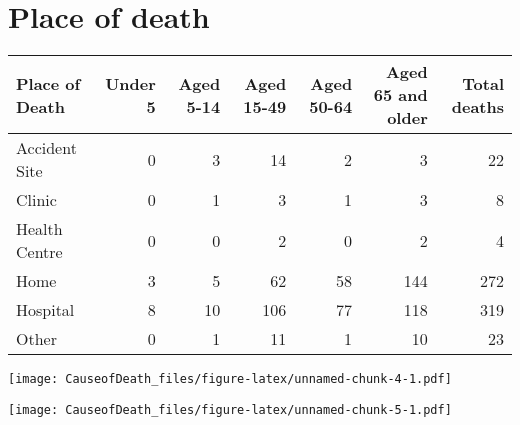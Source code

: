 \documentclass[
]{article}
\begin{document}
\hypertarget{place-of-death}{%
\section{Place of death}\label{place-of-death}}

\begin{table}[H]
\centering
\begin{tabular}{lrrrrrr}
\toprule
Place of Death & Under 5 & Aged 5-14 & Aged 15-49 & Aged 50-64 & Aged 65 and older & Total deaths\\
\midrule
Accident Site & 0 & 3 & 14 & 2 & 3 & 22\\
Clinic & 0 & 1 & 3 & 1 & 3 & 8\\
Health Centre & 0 & 0 & 2 & 0 & 2 & 4\\
Home & 3 & 5 & 62 & 58 & 144 & 272\\
Hospital & 8 & 10 & 106 & 77 & 118 & 319\\
\addlinespace
Other & 0 & 1 & 11 & 1 & 10 & 23\\
\bottomrule
\end{tabular}
\end{table}

\texttt{[image: CauseofDeath\_files/figure-latex/unnamed-chunk-4-1.pdf]}

\texttt{[image: CauseofDeath\_files/figure-latex/unnamed-chunk-5-1.pdf]}
\end{document}
